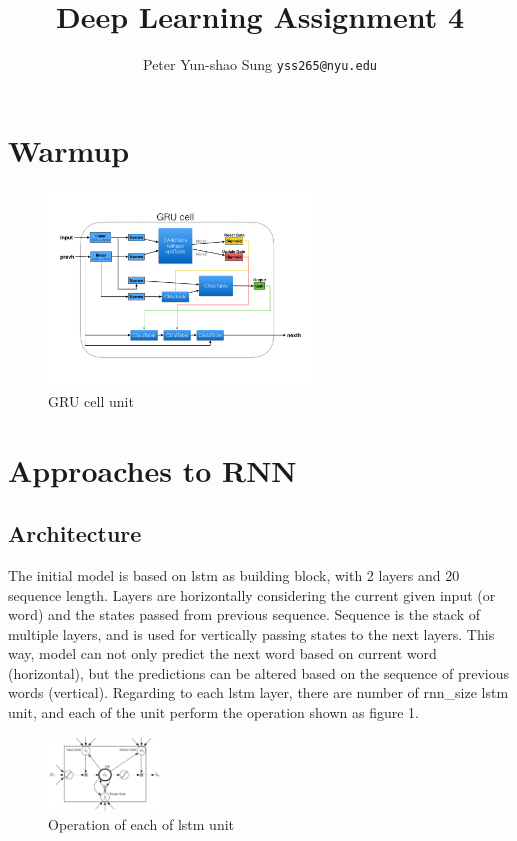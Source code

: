 \documentclass{article}
\title{Deep Learning Assignment 4}
\author{
  Peter Yun-shao Sung
  \texttt{yss265@nyu.edu} \\
}
\begin{document}

\maketitle
\section{Warmup}
\begin{figure}[h]
\centering
\includegraphics[width=70mm]{../q2/q2.png}
  \caption{GRU cell unit}
\end{figure}

\section{Approaches to RNN}
\subsection{Architecture}
The initial model is based on lstm as building block, with 2 layers and 20 sequence length. Layers are horizontally considering the current given input (or word) and the states passed from previous sequence. Sequence is the stack of multiple layers, and is used for vertically passing states to the next layers. This way, model can not only predict the next word based on current word (horizontal), but the predictions can be altered based on the sequence of previous words (vertical). Regarding to each lstm layer, there are number of rnn\_size lstm unit, and each of the unit perform the operation shown as figure 1.

\begin{figure}[h]
\centering
\includegraphics[width=30mm]{./fig/lstm.png}
  \caption{Operation of each of lstm unit}
\end{figure}
\end{document}
